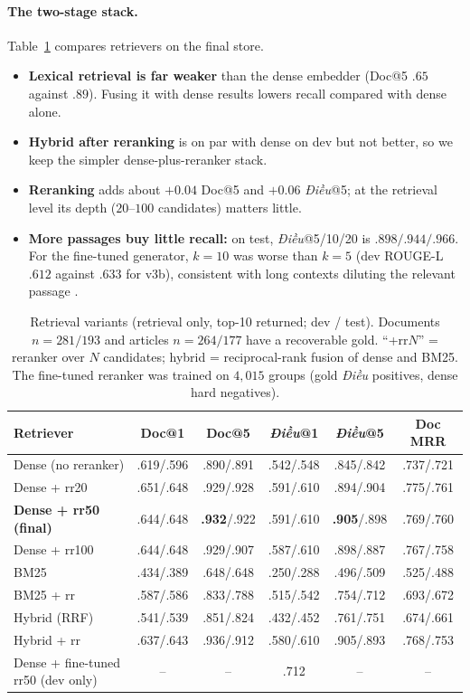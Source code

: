 \documentclass[11pt,a4paper]{article}
\newcommand{\rl}{ROUGE-L}
\newcommand{\dieu}{\textit{Điều}}
\newcommand{\best}[1]{\textbf{#1}}
\begin{document}
\paragraph{The two-stage stack.}
Table~\ref{tab:retrabl} compares retrievers on the final store.
\begin{itemize}[leftmargin=*]
\item \textbf{Lexical retrieval is far weaker} than the dense embedder (Doc@5 $.65$ against $.89$). Fusing it with dense results lowers recall compared with dense alone.
\item \textbf{Hybrid after reranking} is on par with dense on dev but not better, so we keep the simpler dense-plus-reranker stack.
\item \textbf{Reranking} adds about $+0.04$ Doc@5 and $+0.06$ \dieu{}@5; at the retrieval level its depth ($20$--$100$ candidates) matters little.
\item \textbf{More passages buy little recall:} on test, \dieu{}@5/10/20 is $.898/.944/.966$. For the fine-tuned generator, $k{=}10$ was worse than $k{=}5$ (dev \rl{} $.612$ against $.633$ for v3b), consistent with long contexts diluting the relevant passage \cite{lostmiddle}.
\end{itemize}
\begin{table}[H]
\centering
\caption{Retrieval variants (retrieval only, top-10 returned; dev / test). Documents $n{=}281/193$ and articles $n{=}264/177$ have a recoverable gold. ``+rr$N$'' = reranker over $N$ candidates; hybrid = reciprocal-rank fusion of dense and BM25. The fine-tuned reranker was trained on $4{,}015$ groups (gold \dieu{} positives, dense hard negatives).}\label{tab:retrabl}
\begin{tabular}{@{}lccccc@{}}
\toprule
Retriever & Doc@1 & Doc@5 & \dieu{}@1 & \dieu{}@5 & Doc MRR\\
\midrule
Dense (no reranker) & .619/.596 & .890/.891 & .542/.548 & .845/.842 & .737/.721\\
Dense + rr20 & .651/.648 & .929/.928 & .591/.610 & .894/.904 & .775/.761\\
\textbf{Dense + rr50 (final)} & .644/.648 & \best{.932}/.922 & .591/.610 & \best{.905}/.898 & .769/.760\\
Dense + rr100 & .644/.648 & .929/.907 & .587/.610 & .898/.887 & .767/.758\\
BM25 & .434/.389 & .648/.648 & .250/.288 & .496/.509 & .525/.488\\
BM25 + rr & .587/.586 & .833/.788 & .515/.542 & .754/.712 & .693/.672\\
Hybrid (RRF) & .541/.539 & .851/.824 & .432/.452 & .761/.751 & .674/.661\\
Hybrid + rr & .637/.643 & .936/.912 & .580/.610 & .905/.893 & .768/.753\\
Dense + fine-tuned rr50 (dev only) & -- & -- & .712 & -- & --\\
\bottomrule
\end{tabular}
\end{table}
\end{document}
